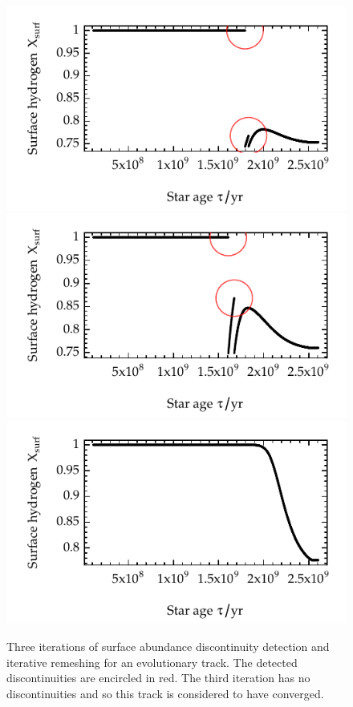 \begin{figure}[t!]
    \centering
    \includegraphics[width=0.7\linewidth,keepaspectratio,natwidth=251,natheight=150,trim={0 1.4cm 0 0.25cm},clip]{discontinuity-1.pdf}\\
    \includegraphics[width=0.7\linewidth,keepaspectratio,natwidth=251,natheight=150,trim={0 1.4cm 0 0.25cm},clip]{discontinuity-2.pdf}\\
    \includegraphics[width=0.7\linewidth,keepaspectratio,natwidth=251,natheight=150,trim={0 0 0 0.25cm},clip]{discontinuity-3.pdf}\\
    \caption[Surface abundance discontinuity detection]{Three iterations of surface abundance discontinuity detection and iterative remeshing for an evolutionary track. The detected discontinuities are encircled in red. The third iteration has no discontinuities and so this track is considered to have converged. \vspace*{5mm} \label{fig:discontinuity} }
\end{figure}

